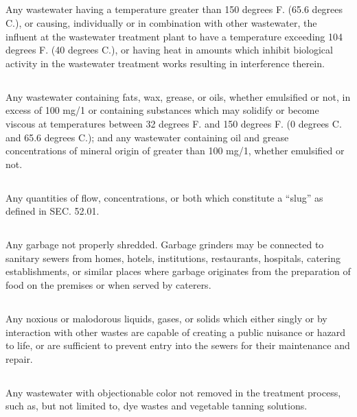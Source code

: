 \documentclass[code.tex]{subfiles}
\begin{document}
\subsection{}
Any wastewater having a temperature greater than 150 degrees F. (65.6 degrees C.), or causing, individually or in combination with other wastewater, the influent at the wastewater treatment plant to have a temperature exceeding 104 degrees F. (40 degrees C.), or having heat in amounts which inhibit biological activity in the wastewater treatment works resulting in interference therein.
\subsection{}
Any wastewater containing fats, wax, grease, or oils, whether emulsified or not, in excess of 100 mg/1 or containing substances which may solidify or become viscous at temperatures between 32 degrees F. and 150 degrees F. (0 degrees C. and 65.6 degrees C.); and any wastewater containing oil and grease concentrations of mineral origin of greater than 100 mg/1, whether emulsified or not.
\subsection{}
Any quantities of flow, concentrations, or both which constitute a “slug” as defined in SEC. 52.01.
\subsection{}
Any garbage not properly shredded.  Garbage grinders may be connected to sanitary sewers from homes, hotels, institutions, restaurants, hospitals, catering establishments, or similar places where garbage originates from the preparation of food on the premises or when served by caterers.
\subsection{}
Any noxious or malodorous liquids, gases, or solids which either singly or by interaction with other wastes are capable of creating a public nuisance or hazard to life, or are sufficient to prevent entry into the sewers for their maintenance and repair.
\subsection{}
Any wastewater with objectionable color not removed in the treatment process, such as, but not limited to, dye wastes and vegetable tanning solutions.
\end{document}
